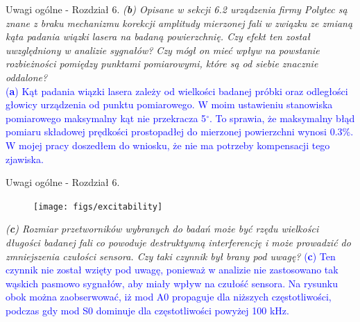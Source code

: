 \documentclass[10pt,aspectratio=169]{beamer} %
\begin{document}
\begin{frame}[label=frame24]{Uwagi ogólne - Rozdział 6.}\justifying
\textit{(\textbf{b}) Opisane w sekcji 6.2 urządzenia firmy Polytec są znane z braku mechanizmu korekcji	amplitudy mierzonej fali w związku ze zmianą kąta padania wiązki lasera na badaną powierzchnię. Czy efekt ten został uwzględniony w analizie sygnałów? Czy mógł on mieć wpływ na powstanie rozbieżności pomiędzy punktami pomiarowymi, które są od siebie znacznie oddalone?}\\
\textcolor{blue}{(\textbf{a}) Kąt padania wiązki lasera zależy od wielkości badanej próbki oraz odległości głowicy urządzenia od punktu pomiarowego. W moim ustawieniu stanowiska pomiarowego maksymalny kąt nie przekracza 5\(^{\circ}\). To sprawia, że maksymalny błąd pomiaru składowej prędkości prostopadłej do mierzonej powierzchni wynosi 0.3\%. W mojej pracy doszedłem do wniosku, że nie ma potrzeby kompensacji tego zjawiska.}
\end{frame}

\begin{frame}[label=frame25]{Uwagi ogólne - Rozdział 6.}\justifying
\begin{figure}
	\centering
	\texttt{[image: figs/excitability]}
\end{figure}	
\textit{(\textbf{c}) Rozmiar przetworników wybranych do badań może być rzędu wielkości długości	badanej fali co powoduje destruktywną interferencję i może prowadzić do zmniejszenia	czułości sensora. Czy taki czynnik był brany pod uwagę?} \textcolor{blue}{(\textbf{c}) Ten czynnik nie został wzięty pod uwagę, ponieważ w analizie nie zastosowano tak wąskich pasmowo sygnałów, aby miały wpływ na czułość sensora. Na rysunku obok można zaobserwować, iż mod A0 propaguje dla niższych częstotliwości, podczas gdy mod S0 dominuje dla częstotliwości powyżej 100 kHz.}
\end{frame}
\end{document}
